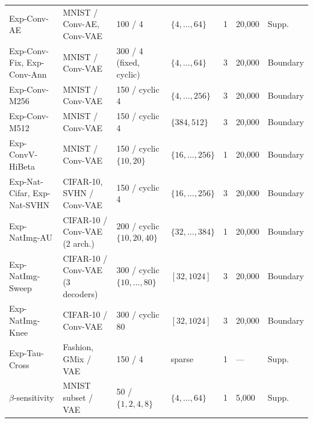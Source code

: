 \documentclass[11pt,a4paper]{jsarticle}
\begin{document}
\begin{table}[H]
\begin{tabular}{p{3.0cm}p{2.9cm}p{2.2cm}p{2.9cm}cp{1.2cm}p{1.5cm}}
Exp-Conv-AE & MNIST / Conv-AE, Conv-VAE & 100 / 4 & $\{4,\ldots,64\}$ & 1 & 20,000 & Supp. \\
Exp-Conv-Fix, Exp-Conv-Ann & MNIST / Conv-VAE & 300 / 4 (fixed, cyclic) & $\{4,\ldots,64\}$ & 3 & 20,000 & Boundary \\
Exp-Conv-M256 & MNIST / Conv-VAE & 150 / cyclic 4 & $\{4,\ldots,256\}$ & 3 & 20,000 & Boundary \\
Exp-Conv-M512 & MNIST / Conv-VAE & 150 / cyclic 4 & $\{384,512\}$ & 3 & 20,000 & Boundary \\
Exp-ConvV-HiBeta & MNIST / Conv-VAE & 150 / cyclic $\{10,20\}$ & $\{16,\ldots,256\}$ & 1 & 20,000 & Boundary \\
Exp-Nat-Cifar, Exp-Nat-SVHN & CIFAR-10, SVHN / Conv-VAE & 150 / cyclic 4 & $\{16,\ldots,256\}$ & 3 & 20,000 & Boundary \\
Exp-NatImg-AU & CIFAR-10 / Conv-VAE (2 arch.) & 200 / cyclic $\{10,20,40\}$ & $\{32,\ldots,384\}$ & 1 & 20,000 & Boundary \\
Exp-NatImg-Sweep & CIFAR-10 / Conv-VAE (3 decoders) & 300 / cyclic $\{10,\ldots,80\}$ & $[32,1024]$ & 3 & 20,000 & Boundary \\
Exp-NatImg-Knee & CIFAR-10 / Conv-VAE & 300 / cyclic 80 & $[32,1024]$ & 3 & 20,000 & Boundary \\
Exp-Tau-Cross & Fashion, GMix / VAE & 150 / 4 & sparse & 1 & --- & Supp. \\
$\beta$-sensitivity & MNIST subset / VAE & 50 / $\{1,2,4,8\}$ & $\{4,\ldots,64\}$ & 1 & 5,000 & Supp. \\
\bottomrule
\end{tabular}
\end{table}

\end{document}

